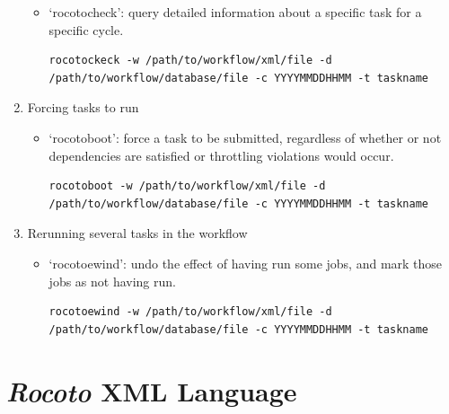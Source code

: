\documentclass[11pt,fleqn]{report}              %
\begin{document}
\begin{enumerate}
\begin{itemize}
	\item `rocotocheck': query detailed information about a specific task for a specific cycle.
\lstset{language=bash}   
\begin{lstlisting}[frame=trBL]
rocotockeck -w /path/to/workflow/xml/file -d /path/to/workflow/database/file -c YYYYMMDDHHMM -t taskname
\end{lstlisting}
	\end{itemize}

\item Forcing tasks to run
	\begin{itemize}
	\item `rocotoboot': force a task to be submitted, regardless of whether or not dependencies are satisfied or throttling violations would occur.	
\lstset{language=bash}   
\begin{lstlisting}[frame=trBL]
rocotoboot -w /path/to/workflow/xml/file -d /path/to/workflow/database/file -c YYYYMMDDHHMM -t taskname
\end{lstlisting}
	\end{itemize}

\item Rerunning several tasks in the workflow
	\begin{itemize}
	\item `rocotoewind': undo the effect of having run some jobs, and mark those jobs as not having run.
\lstset{language=bash}   
\begin{lstlisting}[frame=trBL]
rocotoewind -w /path/to/workflow/xml/file -d /path/to/workflow/database/file -c YYYYMMDDHHMM -t taskname
\end{lstlisting}
	\end{itemize}

\end{enumerate}



\section{{\it Rocoto} XML Language}
\label{sec:rocotoXML}
\end{document}
